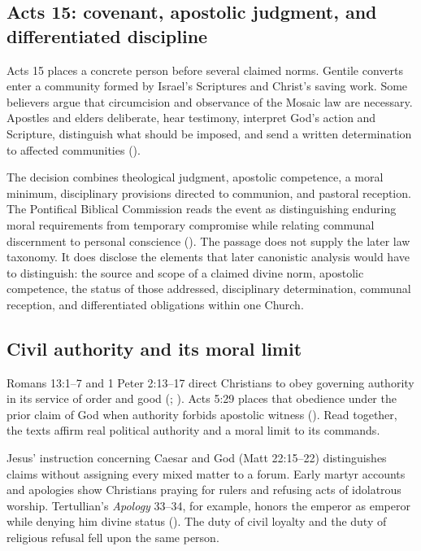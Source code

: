 \subsection{Acts 15: covenant, apostolic judgment, and differentiated discipline}

Acts 15 places a concrete person before several claimed norms. Gentile converts enter a community formed by Israel's Scriptures and Christ's saving work. Some believers argue that circumcision and observance of the Mosaic law are necessary. Apostles and elders deliberate, hear testimony, interpret God's action and Scripture, distinguish what should be imposed, and send a written determination to affected communities ().

The decision combines theological judgment, apostolic competence, a moral minimum, disciplinary provisions directed to communion, and pastoral reception. The Pontifical Biblical Commission reads the event as distinguishing enduring moral requirements from temporary compromise while relating communal discernment to personal conscience (). The passage does not supply the later law taxonomy. It does disclose the elements that later canonistic analysis would have to distinguish: the source and scope of a claimed divine norm, apostolic competence, the status of those addressed, disciplinary determination, communal reception, and differentiated obligations within one Church.

\subsection{Civil authority and its moral limit}

Romans 13:1--7 and 1 Peter 2:13--17 direct Christians to obey governing authority in its service of order and good (; ). Acts 5:29 places that obedience under the prior claim of God when authority forbids apostolic witness (). Read together, the texts affirm real political authority and a moral limit to its commands.

Jesus' instruction concerning Caesar and God (Matt 22:15--22) distinguishes claims without assigning every mixed matter to a forum. Early martyr accounts and apologies show Christians praying for rulers and refusing acts of idolatrous worship. Tertullian's \emph{Apology} 33--34, for example, honors the emperor as emperor while denying him divine status (). The duty of civil loyalty and the duty of religious refusal fell upon the same person.

